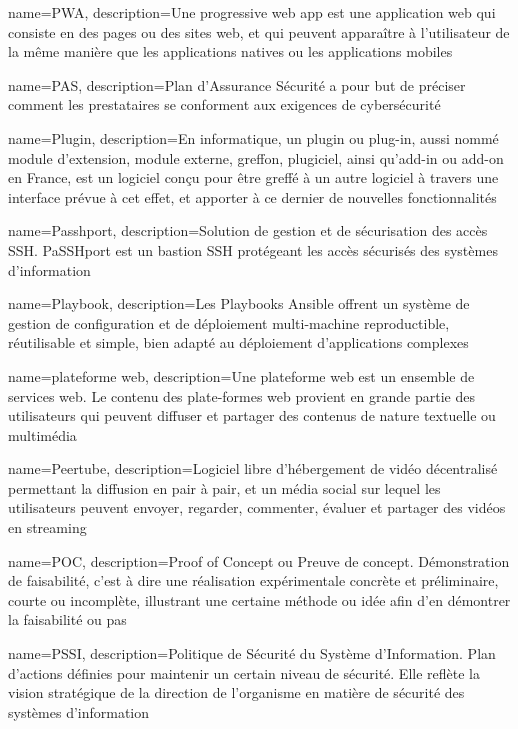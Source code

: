 {
    name=PWA,
    description={Une progressive web app est une application web qui consiste en des pages ou des sites web, et qui peuvent apparaître à l'utilisateur de la même manière que les applications natives ou les applications mobiles}
}

{
    name=PAS,
    description={Plan d'Assurance Sécurité a pour but de préciser comment les prestataires se conforment aux exigences de cybersécurité}
}

{
    name=Plugin,
    description={En informatique, un plugin ou plug-in, aussi nommé module d'extension, module externe, greffon, plugiciel, ainsi qu'add-in ou add-on en France, est un logiciel conçu pour être greffé à un autre logiciel à travers une interface prévue à cet effet, et apporter à ce dernier de nouvelles fonctionnalités}
}

{
    name=Passhport,
    description={Solution de gestion et de sécurisation des accès SSH. PaSSHport est un bastion SSH protégeant les accès sécurisés des systèmes d'information}
}

{
    name=Playbook,
    description={Les Playbooks Ansible offrent un système de gestion de configuration et de déploiement multi-machine reproductible, réutilisable et simple, bien adapté au déploiement d'applications complexes}
}

{
    name=plateforme web,
    description={Une plateforme web est un ensemble de services web. Le contenu des plate-formes web provient en grande partie des utilisateurs qui peuvent diffuser et partager des contenus de nature textuelle ou multimédia}
}

{
    name=Peertube,
    description={Logiciel libre d'hébergement de vidéo décentralisé permettant la diffusion en pair à pair, et un média social sur lequel les utilisateurs peuvent envoyer, regarder, commenter, évaluer et partager des vidéos en streaming}
}

{
    name=POC,
    description={Proof of Concept ou Preuve de concept. Démonstration de faisabilité, c'est à dire une réalisation expérimentale concrète et préliminaire, courte ou incomplète, illustrant une certaine méthode ou idée afin d'en démontrer la faisabilité ou pas}
}

{
    name=PSSI,
    description={Politique de Sécurité du Système d'Information. Plan d'actions définies pour maintenir un certain niveau de sécurité. Elle reflète la vision stratégique de la direction de l'organisme en matière de sécurité des systèmes d'information}
}

